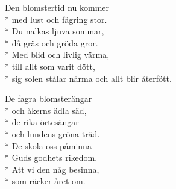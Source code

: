 \begin{SongText}
    \begin{SongVerse}
        Den blomstertid nu kommer\\*%
        med lust och fägring stor.\\*%
        Du nalkas ljuva sommar,\\*%
        då gräs och gröda gror.\\*%
        Med blid och livlig värma,\\*%
        till allt som varit dött,\\*%
        sig solen stålar närma och allt blir återfött.
    \end{SongVerse}
    \begin{SongVerse}
        De fagra blomsterängar\\*%
        och åkerns ädla säd,\\*%
        de rika örtesängar\\*%
        och lundens gröna träd.\\*%
        De skola oss påminna\\*%
        Guds godhets rikedom.\\*%
        Att vi den någ besinna,\\*%
        som räcker året om.
    \end{SongVerse}
\end{SongText}